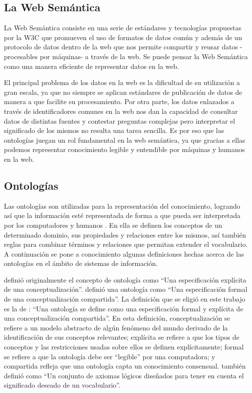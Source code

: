 \subsection{La Web Semántica}
La Web Semántica consiste en una serie de estándares y tecnologías propuestas por la W3C que promueven el uso de formatos de datos común y además de un protocolo de datos dentro de la web que nos permite compartir y reusar datos -procesables por máquinas- a través de la web. Se puede pensar la Web Semántica como una manera eficiente de representar datos en la web.

El principal problema de los datos en la web es la dificultad de su utilización a gran escala, ya que no siempre se aplican estándares de publicación de datos de manera a que facilite su procesamiento. Por otra parte, los datos enlazados a través de identificadores comunes en la web nos dan la capacidad de consultar datos de distintas fuentes y contestar preguntas complejas pero interpretar el significado de los mismos no resulta una tarea sencilla. Es por eso que las ontologías juegan un rol fundamental en la web semántica, ya que gracias a ellas podemos representar conocimiento legible y entendible por máquinas y humanos en la web.

\subsection{Ontologías}
Las ontologías son utilizadas para la representación del conocimiento, logrando así que la información esté representada de forma a que pueda ser interpretada por los computadores y humanos \cite{horrocks2011kr}. En ella se definen los conceptos de un determinado dominio, sus propiedades y relaciones entre los mismos, así también reglas para combinar términos y relaciones que permitan extender el vocabulario.
A continuación se pone a conocimiento algunas definiciones hechas acerca de las ontologías en el ámbito de sistemas de información.

\cite{gruber1993translation} definió originalmente el concepto de ontología como “Una especificación explícita de una conceptualización”. \cite{borst1997construction} definió una ontología como “Una especificación formal de una conceptualización compartida”. La definición que se eligió en este trabajo es la de \cite{studer1998knowledge}: “Una ontología se define como una especificación formal y explícita de una conceptualización compartida”.  En esta definición, conceptualización se refiere a un modelo abstracto de algún fenómeno del mundo derivado de la identificación de sus conceptos relevantes; explícita se refiere a que los tipos de conceptos y las restricciones usadas sobre ellos se definen explícitamente; formal se refiere a que la ontología debe ser “legible” por una computadora; y compartida refleja que una ontología capta un conocimiento consensual. \cite{guarino1998formal} también definió como “Un conjunto de axiomas lógicos diseñados para tener en cuenta el significado deseado de un vocabulario”.


